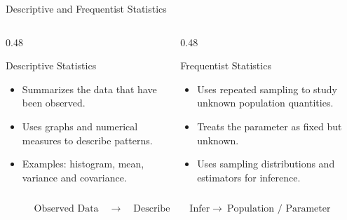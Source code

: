 \documentclass{beamer}
\begin{document}
\begin{frame}{Descriptive and Frequentist Statistics}

\begin{columns}[T]

\begin{column}{0.48\textwidth}

\begin{block}{Descriptive Statistics}
\begin{itemize}
    \item Summarizes the data that have been observed.
    \item Uses graphs and numerical measures
          to describe patterns.
    \item Examples: histogram, mean, variance
          and covariance.
\end{itemize}
\end{block}

\end{column}

\begin{column}{0.48\textwidth}

\begin{block}{Frequentist Statistics}
\begin{itemize}
    \item Uses repeated sampling to study
          unknown population quantities.
    \item Treats the parameter as fixed but unknown.
    \item Uses sampling distributions and
          estimators for inference.
\end{itemize}
\end{block}

\end{column}

\end{columns}

\vspace{0.45cm}

\begin{center}
\[
\text{Observed Data}
\quad\longrightarrow\quad
\boxed{\text{Describe}}
\qquad
\boxed{\text{Infer}}
\longrightarrow\
\text{Population / Parameter}
\]
\end{center}

\end{frame}

\end{document}
